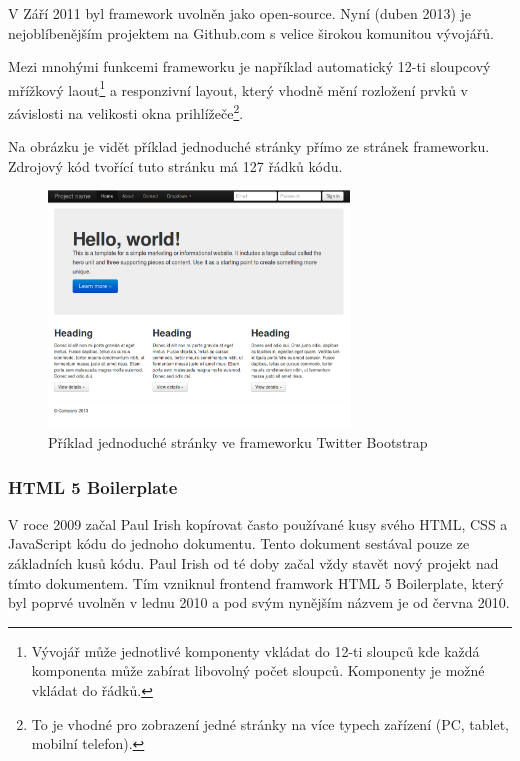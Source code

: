 V Září 2011 byl framework uvolněn jako open-source. Nyní (duben 2013) je nejoblíbenějším projektem na Github.com s velice širokou komunitou vývojářů\cite{website:github-popular}.


Mezi mnohými funkcemi frameworku je například automatický 12-ti sloupcový mřížkový laout\footnote{Vývojář může jednotlivé komponenty vkládat do 12-ti sloupců kde každá komponenta může zabírat libovolný počet sloupců. Komponenty je možné vkládat do řádků.} a responzivní layout, který vhodně mění rozložení prvků v závislosti na velikosti okna prihlížeče\footnote{To je vhodné pro zobrazení jedné stránky na více typech zařízení (PC, tablet, mobilní telefon).}.

Na obrázku je vidět příklad jednoduché stránky přímo ze stránek frameworku. Zdrojový kód tvořící tuto stránku má 127 řádků kódu\cite{website:bootstrap-example}.

\begin{figure}[htb]
\begin{center}
\includegraphics[width=80mm]{./pictures/bootstrap-example.png}
\caption{Příklad jednoduché stránky ve frameworku Twitter Bootstrap \cite{website:bootstrap-example}}
\label{fig:bootstrap-example}
\end{center}
\end{figure}

\subsubsection{HTML 5 Boilerplate}
V roce 2009 začal Paul Irish kopírovat často používané kusy svého HTML, CSS a JavaScript kódu do jednoho dokumentu. Tento dokument sestával pouze ze základních kusů kódu. Paul Irish od té doby začal vždy stavět nový projekt nad tímto dokumentem. Tím vzniknul frontend framwork HTML 5 Boilerplate, který byl poprvé uvolněn v lednu 2010 a pod svým nynějším názvem je od června 2010.\cite{website:boilerplate-history}

